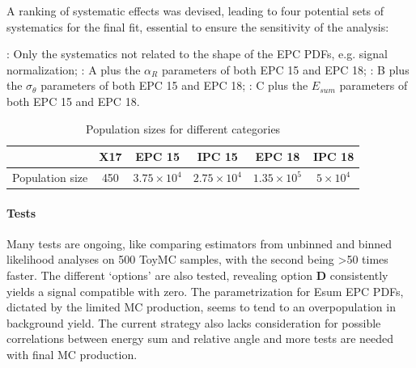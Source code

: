 \begin{refsection}
        \noindent
        A ranking of systematic effects was devised, leading to four potential sets of systematics for the final fit, essential to ensure the sensitivity of the analysis:
        \begin{outline}
            \1[\textbf{A}]: Only the systematics not related to the shape of the EPC PDFs, e.g. signal normalization;
            \1[\textbf{B}]: A plus the $\alpha_R$ parameters of both EPC 15 and EPC 18;
            \1[\textbf{C}]: B plus the $\sigma_{\theta}$ parameters of both EPC 15 and EPC 18;
            \1[\textbf{D}]: C plus the $E_{sum}$ parameters of both EPC 15 and EPC 18.
        \end{outline}

        \begin{table}[htbp]
            \centering
            \caption{Population sizes for different categories}
            \begin{tabular}{|c|c|c|c|c|c|}
                \hline
                & X17 & EPC 15 & IPC 15 & EPC 18 & IPC 18 \\
                \hline
                Population size & 450 & $3.75 \times 10^4$ & $2.75 \times 10^4$ & $1.35 \times 10^5$ & $5 \times 10^4$ \\
                \hline
            \end{tabular}
            \label{tab:X17:populations}
        \end{table}
        
\paragraph{Tests}
Many tests are ongoing, like comparing estimators from unbinned and binned likelihood analyses on 500 ToyMC samples, with the second being >50 times faster. 
The different `options' are also tested, revealing option \textbf{D} consistently yields a signal compatible with zero. 
The parametrization for Esum EPC PDFs, dictated by the limited MC production, seems to tend to an overpopulation in background yield. 
The current strategy also lacks consideration for possible correlations between energy sum and relative angle and more tests are needed with final MC production. 


\end{refsection}
